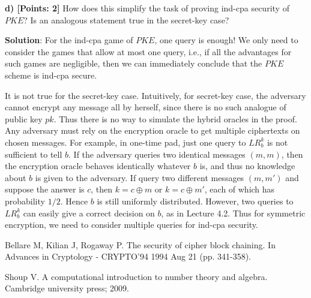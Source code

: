 \documentclass[12pt]{article}
\theoremstyle{definition}
\begin{document}
{\bf d) [Points: 2]} How does this simplify the task of proving ind-cpa security of $PKE$? Is an
analogous statement true in the secret-key case?

{\bf Solution}: For the ind-cpa game of $PKE$, one query is enough! We only need to consider the games that allow at most one query, i.e., if all the advantages for such games are negligible, then we can immediately conclude that the $PKE$ scheme is ind-cpa secure.

It is not true for the secret-key case. Intuitively, for secret-key case, the adversary cannot encrypt any message all by herself, since there is no such analogue of public key $pk$. Thus there is no way to simulate the hybrid oracles in the proof. Any adversary must rely on the encryption oracle to get multiple ciphertexts on chosen messages. For example, in one-time pad, just one query to $LR_b^k$ is not sufficient to tell $b$. If the adversary queries two identical messages $(m, m)$, then the encryption oracle behaves identically whatever $b$ is, and thus no knowledge about $b$ is given to the adversary. If query two different messages $(m,m')$ and suppose the answer is $c$, then $k = c \oplus m$ or $k = c \oplus m'$, each of which has probability $1/2$. Hence $b$ is still uniformly distributed. However, two queries to $LR_b^k$ can easily give a correct decision on $b$, as in Lecture 4.2. Thus for symmetric encryption, we need to consider multiple queries for ind-cpa security.

\begin{thebibliography}{10}
Bellare M, Kilian J, Rogaway P. The security of cipher block chaining. In Advances in Cryptology - CRYPTO’94 1994 Aug 21 (pp. 341-358).

Shoup V. A computational introduction to number theory and algebra. Cambridge university press; 2009.
\end{thebibliography}
\end{document}
